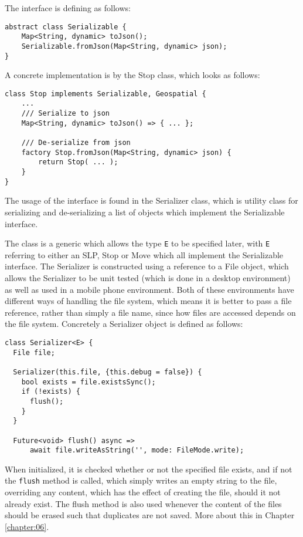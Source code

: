 The interface is defining as follows:
\begin{verbatim}
abstract class Serializable {
    Map<String, dynamic> toJson();
    Serializable.fromJson(Map<String, dynamic> json);
}
\end{verbatim}

A concrete implementation is by the Stop class, which looks as follows:

\begin{verbatim}
class Stop implements Serializable, Geospatial { 
    ...
    /// Serialize to json
    Map<String, dynamic> toJson() => { ... };

    /// De-serialize from json
    factory Stop.fromJson(Map<String, dynamic> json) {
        return Stop( ... );
    }
}
\end{verbatim}

The usage of the interface is found in the Serializer class, which is utility class for serializing and de-serializing a list of objects which implement the Serializable interface.

The class is a generic which allows the type \verb|E| to be specified later, with \verb|E| referring to either an SLP, Stop or Move which all implement the Serializable interface. The Serializer is constructed using a reference to a File object, which allows the Serializer to be unit tested (which is done in a desktop environment) as well as used in a mobile phone environment. Both of these environments have different ways of handling the file system, which means it is better to pass a file reference, rather than simply a file name, since how files are accessed depends on the file system. Concretely a Serializer object is defined as follows:
\begin{verbatim}
class Serializer<E> {
  File file;
  
  Serializer(this.file, {this.debug = false}) {
    bool exists = file.existsSync();
    if (!exists) {
      flush();
    }
  }
  
  Future<void> flush() async =>
      await file.writeAsString('', mode: FileMode.write);
\end{verbatim}

When initialized, it is checked whether or not the specified file exists, and if not the \verb|flush| method is called, which simply writes an empty string to the file, overriding any content, which has the effect of creating the file, should it not already exist. The flush method is also used whenever the content of the files should be erased such that duplicates are not saved. More about this in Chapter \ref{chapter:06}.

